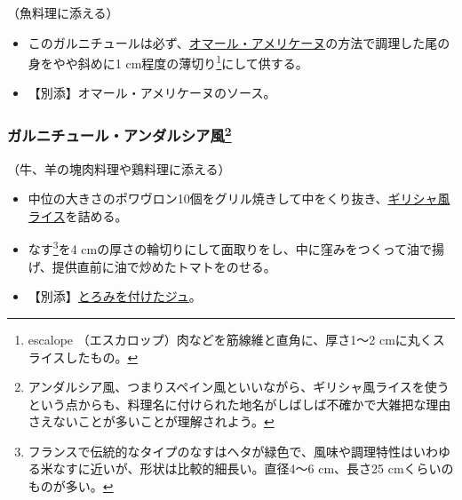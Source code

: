 \begin{recette}
（魚料理に添える）

\begin{itemize}
\item
  このガルニチュールは必ず、\protect\hyperlink{homard-americaine}{オマール・アメリケーヌ}の方法で調理した尾の身をやや斜めに1
  cm程度の薄切り\footnote{escalope
    （エスカロップ）肉などを筋線維と直角に、厚さ1〜2
    cmに丸くスライスしたもの。}にして供する。
\item
  【別添】オマール・アメリケーヌのソース。
\end{itemize}

\atoaki{}

\hypertarget{garniture-andalouse}{%
\subsubsection[ガルニチュール・アンダルシア風]{\texorpdfstring{ガルニチュール・アンダルシア風\footnote{アンダルシア風、つまりスペイン風といいながら、ギリシャ風ライスを使うという点からも、料理名に付けられた地名がしばしば不確かで大雑把な理由さえないことが多いことが理解されよう。}}{ガルニチュール・アンダルシア風}}\label{garniture-andalouse}}



（牛、羊の塊肉料理や鶏料理に添える）

\begin{itemize}
\item
  中位の大きさのポワヴロン10個をグリル焼きして中をくり抜き、\protect\hyperlink{riz-grecque}{ギリシャ風ライス}を詰める。
\item
  なす\footnote{フランスで伝統的なタイプのなすはヘタが緑色で、風味や調理特性はいわゆる米なすに近いが、形状は比較的細長い。直径4〜6
    cm、長さ25 cmくらいのものが多い。}を4
  cmの厚さの輪切りにして面取りをし、中に窪みをつくって油で揚げ、提供直前に油で炒めたトマトをのせる。
\item
  【別添】\protect\hyperlink{jus-de-veau-lie}{とろみを付けたジュ}。
\end{itemize}

\atoaki{}


\end{recette}
